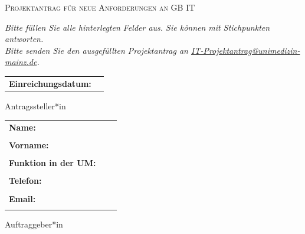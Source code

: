 \begin{titlepage}
	\thispagestyle{firstpage}
	\vspace{1cm}
	{\centering

		{\scshape\huge Projektantrag für neue Anforderungen an GB IT \par}
	}
	\vspace{1cm}

	\textit{Bitte füllen Sie alle hinterlegten Felder aus. Sie können mit Stichpunkten antworten. \\
		Bitte senden Sie den ausgefüllten Projektantrag an \href{mailto:IT-Projektantrag@unimedizin-mainz.de}{IT-Projektantrag@unimedizin-mainz.de}. \\
	}

	\vspace{0.5cm}
	\begin{tabular}[c]{lr}
		\textbf{Einreichungsdatum:} & \TextField[name=date, width=3cm]{} \\
	\end{tabular}
	\vspace{0.5cm}

	{\noindent\Large Antragssteller*in}
	\vspace{0.5cm}

	\begin{tabular}{lrp{5cm}}
		\textbf{Name:}               & \TextField[name=nameAnst, width=5cm]{}    \\ \\
		\textbf{Vorname:}            & \TextField[name=surnameAnst, width=5cm]{} \\ \\
		\textbf{Funktion in der UM:} & \TextField[name=funcAnst, width=5cm]{}    \\ \\
		\textbf{Telefon:}            & \TextField[name=phoneAnst, width=5cm]{}   \\ \\
		\textbf{Email:}              & \TextField[name=mailAnst, width=5cm]{}    \\ \\
	\end{tabular}

	\vspace{0.5cm}
	{\noindent\Large Auftraggeber*in}
	\vspace{0.5cm}


\end{titlepage}
